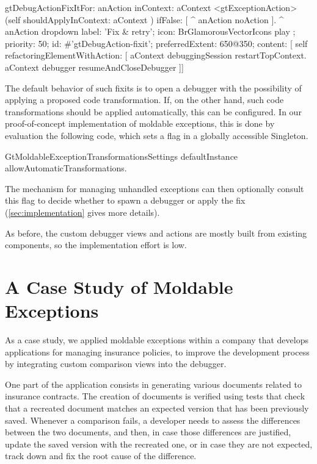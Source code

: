 \documentclass[sigplan,screen]{acmart} %
\newcommand\ac[1]{\nbc{AC}{#1}{teal}}
\begin{document}

\begin{code}
gtDebugActionFixItFor: anAction inContext: aContext
	<gtExceptionAction>
	(self shouldApplyInContext: aContext )
		ifFalse: [ ^ anAction noAction ].
	^ anAction dropdown
		label: 'Fix & retry';
		icon: BrGlamorousVectorIcons play ;
		priority: 50;
		id: #'gtDebugAction-fixit';
		preferredExtent: 650@350;
		content: [ self refactoringElementWithAction: [
			aContext debuggingSession restartTopContext.
			aContext debugger resumeAndCloseDebugger ]]
\end{code}

The default behavior of such fixits is to open a debugger with the possibility of applying a proposed code transformation.
If, on the other hand, such code transformations should be applied automatically, this can be configured.
In our proof-of-concept implementation of moldable exceptions, this is done by evaluation the following code, which sets a flag in a globally accessible Singleton.
\begin{code}
GtMoldableExceptionTransformationsSettings defaultInstance allowAutomaticTransformations.
\end{code}
The mechanism for managing unhandled exceptions can then optionally consult this flag to decide whether to spawn a debugger or apply the fix (\autoref{sec:implementation} gives more details).

As before, the custom debugger views and actions are mostly built from existing components, so the implementation effort is low.

\section{A Case Study of Moldable Exceptions}\label{sec:casestudy}

As a case study, we applied moldable exceptions within a company that develops applications for managing insurance policies, to improve the development process by integrating custom comparison views into the debugger.

One part of the application consists in generating various documents related to insurance contracts.
The creation of documents is verified using tests that check that a recreated document matches an expected version that has been previously saved.
Whenever a comparison fails, a developer needs to assess the differences between the two documents, and then, in case those differences are justified, update the saved version with the recreated one, or in case they are not expected, track down and fix the root cause of the difference.
\end{document}
